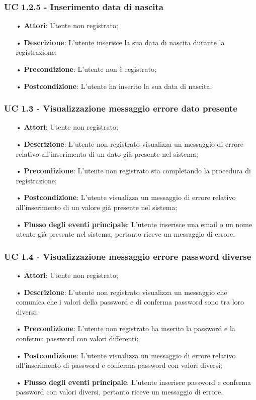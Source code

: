 \subsubsection{UC 1.2.5 - Inserimento data di nascita}
\begin{itemize}
	\item[•]\textbf{Attori}: Utente non registrato;
	\item[•]\textbf{Descrizione}: L'utente inserisce la sua data di nascita durante la registrazione;
	\item[•]\textbf{Precondizione}: L'utente non è registrato;
	\item[•]\textbf{Postcondizione}: L'utente ha inserito la sua data di nascita;
\end{itemize}

\subsubsection{UC 1.3 - Visualizzazione messaggio errore dato presente}
\begin{itemize}
	\item[•]\textbf{Attori}: Utente non registrato;
	\item[•]\textbf{Descrizione}: L'utente non registrato visualizza un messaggio di errore relativo all'inserimento
	di un dato già presente nel sistema;
	\item[•]\textbf{Precondizione}: L'utente non registrato sta completando la procedura di registrazione;
	\item[•]\textbf{Postcondizione}: L'utente visualizza un messaggio di errore relativo all'inserimento di un valore già presente nel sistema;
	\item[•]\textbf{Flusso degli eventi principale}: L'utente inserisce una email o un nome utente già presente nel sistema, pertanto riceve un messaggio di errore.
\end{itemize}

\subsubsection{UC 1.4 - Visualizzazione messaggio errore password diverse}
\begin{itemize}
	\item[•]\textbf{Attori}: Utente non registrato;
	\item[•]\textbf{Descrizione}: L'utente non registrato visualizza un messaggio che comunica che i valori della password e di conferma password sono tra loro diversi;
	\item[•]\textbf{Precondizione}: L'utente non registrato ha inserito la password e la conferma password con valori differenti;
	\item[•]\textbf{Postcondizione}: L'utente visualizza un messaggio di errore relativo all'inserimento di password e conferma password con valori diversi;
	\item[•]\textbf{Flusso degli eventi principale}: L'utente inserisce password e conferma password con valori diversi, pertanto riceve un messaggio di errore.
\end{itemize}